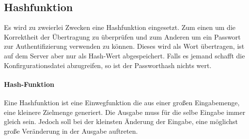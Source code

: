 \subsection{Hashfunktion}
Es wird zu zweierlei Zwecken eine Hashfunktion eingesetzt. Zum einen um die Korrektheit der Übertragung zu überprüfen und zum Anderen um ein Passwort zur Authentifizierung verwenden zu können. Dieses wird als Wort übertragen, ist auf dem Server aber nur als Hash-Wert abgespeichert. Falls es jemand schafft die Konfirgurationsdatei abzugreifen, so ist der Passworthash nichts wert.
\paragraph{Hash-Funktion} Eine Hashfunktion ist eine Einwegfunktion die aus einer großen Eingabemenge, eine kleinere Zielmenge generiert.  Die Ausgabe muss für die selbe Eingabe immer gleich sein. Jedoch soll bei der kleinsten Änderung der Eingabe, eine möglichst große Veränderung in der Ausgabe auftreten.


